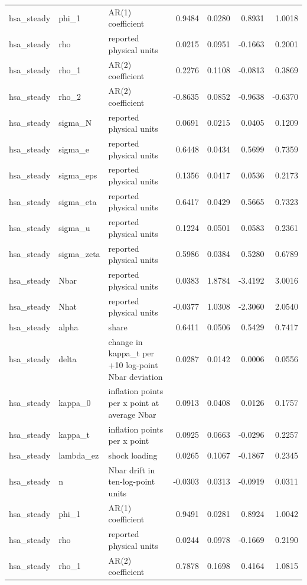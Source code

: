 \begin{tabular}{lllrrrr}
hsa\_steady & phi\_1 & AR(1) coefficient & 0.9484 & 0.0280 & 0.8931 & 1.0018 \\
hsa\_steady & rho & reported physical units & 0.0215 & 0.0951 & -0.1663 & 0.2001 \\
hsa\_steady & rho\_1 & AR(2) coefficient & 0.2276 & 0.1108 & -0.0813 & 0.3869 \\
hsa\_steady & rho\_2 & AR(2) coefficient & -0.8635 & 0.0852 & -0.9638 & -0.6370 \\
hsa\_steady & sigma\_N & reported physical units & 0.0691 & 0.0215 & 0.0405 & 0.1209 \\
hsa\_steady & sigma\_e & reported physical units & 0.6448 & 0.0434 & 0.5699 & 0.7359 \\
hsa\_steady & sigma\_eps & reported physical units & 0.1356 & 0.0417 & 0.0536 & 0.2173 \\
hsa\_steady & sigma\_eta & reported physical units & 0.6417 & 0.0429 & 0.5665 & 0.7323 \\
hsa\_steady & sigma\_u & reported physical units & 0.1224 & 0.0501 & 0.0583 & 0.2361 \\
hsa\_steady & sigma\_zeta & reported physical units & 0.5986 & 0.0384 & 0.5280 & 0.6789 \\
hsa\_steady & Nbar & reported physical units & 0.0383 & 1.8784 & -3.4192 & 3.0016 \\
hsa\_steady & Nhat & reported physical units & -0.0377 & 1.0308 & -2.3060 & 2.0540 \\
hsa\_steady & alpha & share & 0.6411 & 0.0506 & 0.5429 & 0.7417 \\
hsa\_steady & delta & change in kappa\_t per +10 log-point Nbar deviation & 0.0287 & 0.0142 & 0.0006 & 0.0556 \\
hsa\_steady & kappa\_0 & inflation points per x point at average Nbar & 0.0913 & 0.0408 & 0.0126 & 0.1757 \\
hsa\_steady & kappa\_t & inflation points per x point & 0.0925 & 0.0663 & -0.0296 & 0.2257 \\
hsa\_steady & lambda\_ez & shock loading & 0.0265 & 0.1067 & -0.1867 & 0.2345 \\
hsa\_steady & n & Nbar drift in ten-log-point units & -0.0303 & 0.0313 & -0.0919 & 0.0311 \\
hsa\_steady & phi\_1 & AR(1) coefficient & 0.9491 & 0.0281 & 0.8924 & 1.0042 \\
hsa\_steady & rho & reported physical units & 0.0244 & 0.0978 & -0.1669 & 0.2190 \\
hsa\_steady & rho\_1 & AR(2) coefficient & 0.7878 & 0.1698 & 0.4164 & 1.0815 \\

\end{tabular}

